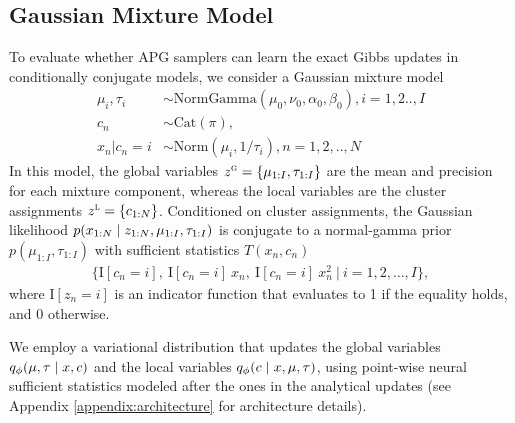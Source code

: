 \documentclass{article}
\theoremstyle{definition}
\begin{document}
\subsection{Gaussian Mixture Model}
\label{sec:gmm}
\vspace{-0.5em}
To evaluate whether APG samplers can learn the exact Gibbs updates in conditionally conjugate models, we consider a Gaussian mixture model 
\begin{align*}
    \mu_i, \tau_i &\sim \text{NormGamma}(\mu_0, \nu_0, \alpha_0, \beta_0)
    , i =1,2..,I \\
    c_n &\sim \mathrm{Cat}(\pi), \\
    x_n | c_n\!=\!i &\sim \text{Norm}(\mu_i, 1 / \tau_i)
    ,n =1,2,..,N
\end{align*}
In this model, the global variables $z^\textsc{g} = \{\mu_{1:I}, \tau_{1:I}\}$ are the mean and precision for each mixture component, whereas the local variables are the cluster assignments $z^\textsc{l} = \{c_{1:N}\}$. Conditioned on cluster assignments, the Gaussian likelihood $p(x_{1:N} \mid z_{1:N}, \mu_{1:I}, \tau_{1:I})$ is conjugate to a normal-gamma prior $p(\mu_{1:I}, \tau_{1:I})$ with sufficient statistics $T(x_n, c_n)$ 
\begin{align*}
    \Big\{\mathrm{I}[c_n \!=\! i], 
        ~\mathrm{I}[c_n \!=\! i] \: x_n, 
        ~\mathrm{I}[c_n \!=\! i] \: x_n^2 
        ~\Big\vert~ i \!=\! 1,2,\dots,I 
    \Big\}
    ,
\end{align*}
where $\mathrm{I}[z_n \!=\! i]$ is an indicator function that evaluates to 1 if the equality holds, and 0 otherwise.

We employ a variational distribution that updates the global variables $q_\phi(\mu, \tau \mid x, c)$ and the local variables $q_\phi(c \mid x, \mu, \tau)$, using point-wise neural sufficient statistics modeled after the ones in the analytical updates (see Appendix \ref{appendix:architecture} for architecture details).
\end{document}

